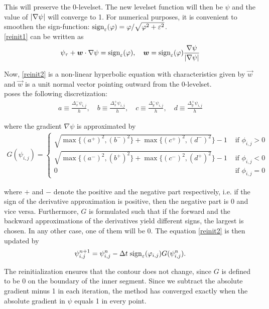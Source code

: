 This will preserve the 0-levelset. The new levelset function will then be $\psi$ and the value of $\left| {\nabla \psi} \right|$ will converge to 1.
For numerical purposes, it is convenient to smoothen the sign-function: ${\rm sign}_\varepsilon(\varphi) = \varphi/\sqrt{\varphi^2+\varepsilon^2}$.\\
\eqref{reinit1} can be written as
\begin{equation}
\psi_\tau + \vec{w}\cdot\nabla\psi = \sign_\epsilon(\phi), \quad \vec{w} = \sign_\epsilon(\phi)\frac{\nabla\psi}{\abs{\nabla\psi}}\label{reinit2}
\end{equation}

Now, \eqref{reinit2} is a non-linear hyperbolic equation with characteristics given by $\vec{w}$ and $\vec{w}$ is a unit normal vector pointing outward from the 0-levelset.\\
\cite{suss.94} poses the following discretization:
\begin{align}
a \equiv \frac{\Delta_x^- \psi_{i,j}}{h},\quad b \equiv \frac{\Delta_x^+ \psi_{i,j}}{h},\quad c \equiv \frac{\Delta_y^- \psi_{i,j}}{h}, \quad d \equiv \frac{\Delta_y^+ \psi_{i,j}}{h} 
\end{align}

where the gradient $\nabla \psi$ is approximated by 
\begin{align}
  G(\psi_{i,j}) = \begin{cases}
    \sqrt{\max\{(a^+)^2,(b^-)^2\}+\max\{(c^+)^2,(d^-)^2}\}-1 & \mbox{ if } \phi_{i,j}>0\\
    \sqrt{\max\{(a^-)^2,(b^+)^2\}+\max\{(c^-)^2,(d^+)^2}\}-1 & \mbox{ if } \phi_{i,j}<0\\
    0 &\mbox{ if } \phi_{i,j}=0
  \end{cases}
\end{align}

where $+$ and $-$ denote the positive and the negative part respectively, i.e. if the sign of the derivative approximation is positive, then the negative part is 0 and vice versa. Furthermore, $G$ is formulated such that if the forward and the backward approximations of the derivatives yield different signs, the largest is chosen. In any other case, one of them will be 0. The equation \eqref{reinit2} is then updated by 
\begin{equation}
\psi_{i,j}^{n+1}=\psi_{i,j}^n - \Delta t \;{\rm sign}_\varepsilon(\varphi_{i,j})G(\psi_{i,j}^n).
\end{equation}

The reinitialization ensures that the contour does not change, since $G$ is defined to be 0 on the boundary of the inner segment. Since we subtract the absolute gradient minus 1 in each iteration, the method has converged exactly when the absolute gradient in $\psi$ equals 1 in every point.